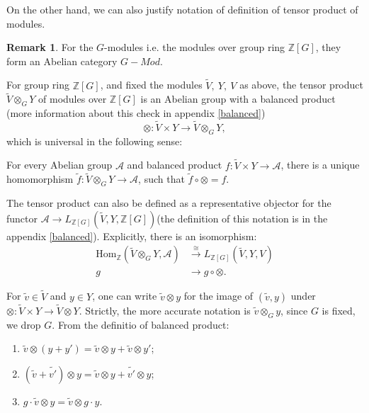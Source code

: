 \documentclass[12pt,a4paper,english]{article}
\theoremstyle{plain}
\theoremstyle{definition}
\newtheorem*{rem}{Remark}
\begin{document}
On the other hand, we can also justify notation of definition of tensor product of modules. 
\begin{rem}
For the $G$-modules i.e. the modules over group ring $\mathbb{Z}[G]$, they form an Abelian category $G-Mod$.
\end{rem}
For group ring $\mathbb{Z}[G]$, and fixed the modules $\tilde{V},\ Y,\ V$ as above, the tensor product $\tilde{V}\otimes_{G}Y$ of modules over $\mathbb{Z}[G]$ is an Abelian group with a balanced product (more information about this check in appendix \ref{balanced})
\begin{equation*}
    \otimes: \tilde{V}\times Y\rightarrow \tilde{V}\otimes_{G}Y,
\end{equation*}
which is universal in the following sense:
\begin{center}
\end{center}
For every Abelian group $\mathcal{A}$ and balanced product $f:\tilde{V}\times Y\rightarrow \mathcal{A}$, there is a unique homomorphism $\tilde{f}: \tilde{V}\otimes_{G}Y\rightarrow \mathcal{A}$, such that $\tilde{f}\circ \otimes=f$. 

The tensor product can also be defined as a representative objector for the functor $\mathcal{A}\rightarrow L_{\mathbb{Z}[G]}(\tilde{V}, Y, \mathbb{Z}[G])$(the definition of this notation is in the appendix \ref{balanced}). Explicitly, there is an isomorphism:
\begin{align*}
\text{Hom}_{\mathbb{Z}}(\tilde{V}\otimes_{G}Y, \mathcal{A})&\xrightarrow{\cong} L_{\mathbb{Z}[G]}(\tilde{V}, Y, V)\\
g&\rightarrow g\circ \otimes.
\end{align*}
  
For $\tilde{v}\in \tilde{V}$ and $y\in Y$, one can write $\tilde{v}\otimes y$ for the image of $(\tilde{v},y)$ under $\otimes: \tilde{V}\times Y\rightarrow \tilde{V}\otimes Y$. Strictly, the more accurate notation is $\tilde{v}\otimes_{G}y$, since $G$ is fixed, we drop $G$. From the definitio of balanced product:
\begin{enumerate}
    \item $\tilde{v}\otimes (y+y')=\tilde{v}\otimes y+\tilde{v}\otimes y'$;
    \item $(\tilde{v}+\tilde{v'})\otimes y=\tilde{v}\otimes y +\tilde{v'}\otimes y$;
    \item $g\cdot\tilde{v}\otimes y=\tilde{v}\otimes g\cdot y$.
\end{enumerate}
\end{document}
